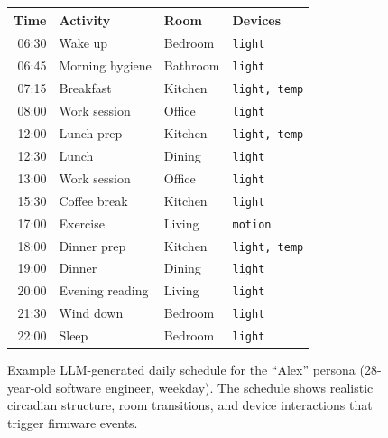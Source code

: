 \begin{figure}[t]
  \centering
  \small
  \setlength{\tabcolsep}{3pt}
  \begin{tabular}{@{}r l l l@{}}
    \toprule
    \textbf{Time} & \textbf{Activity} & \textbf{Room} & \textbf{Devices} \\
    \midrule
    \rowcolor{blue!5}
    06:30 & Wake up          & Bedroom   & \texttt{light} \\
    06:45 & Morning hygiene  & Bathroom  & \texttt{light} \\
    07:15 & Breakfast        & Kitchen   & \texttt{light, temp} \\
    \rowcolor{blue!5}
    08:00 & Work session     & Office    & \texttt{light} \\
    12:00 & Lunch prep       & Kitchen   & \texttt{light, temp} \\
    12:30 & Lunch            & Dining    & \texttt{light} \\
    \rowcolor{blue!5}
    13:00 & Work session     & Office    & \texttt{light} \\
    15:30 & Coffee break     & Kitchen   & \texttt{light} \\
    17:00 & Exercise         & Living    & \texttt{motion} \\
    \rowcolor{blue!5}
    18:00 & Dinner prep      & Kitchen   & \texttt{light, temp} \\
    19:00 & Dinner           & Dining    & \texttt{light} \\
    20:00 & Evening reading  & Living    & \texttt{light} \\
    \rowcolor{blue!5}
    21:30 & Wind down        & Bedroom   & \texttt{light} \\
    22:00 & Sleep            & Bedroom   & \texttt{light} \\
    \bottomrule
  \end{tabular}
  \caption{Example LLM-generated daily schedule for the ``Alex''
  persona (28-year-old software engineer, weekday).  The schedule
  shows realistic circadian structure, room transitions, and
  device interactions that trigger firmware events.}
  \label{fig:schedule-example}
\end{figure}
